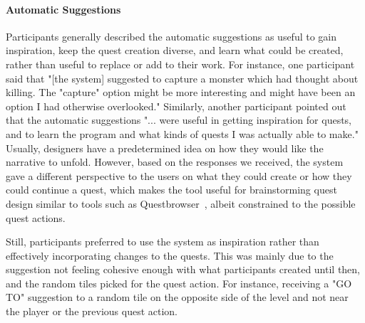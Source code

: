 \paragraph{Automatic Suggestions}

Participants generally described the automatic suggestions as useful to gain inspiration, keep the quest creation diverse, and learn what could be created, rather than useful to replace or add to their work. For instance, one participant said that "[the system] suggested to capture a monster which had thought about killing. The "capture" option might be more interesting and might have been an option I had otherwise overlooked." Similarly, another participant pointed out that the automatic suggestions "... were useful in getting inspiration for quests, and to learn the program and what kinds of quests I was actually able to make." Usually, designers have a predetermined idea on how they would like the narrative to unfold. However, based on the responses we received, the system gave a different perspective to the users on what they could create or how they could continue a quest, which makes the tool useful for brainstorming quest design similar to tools such as Questbrowser~\cite{p8Sullivan2009-questbrowser}, albeit constrained to the possible quest actions.

Still, participants preferred to use the system as inspiration rather than effectively incorporating changes to the quests. This was mainly due to the suggestion not feeling cohesive enough with what participants created until then, and the random tiles picked for the quest action. For instance, receiving a "GO TO" suggestion to a random tile on the opposite side of the level and not near the player or the previous quest action.




